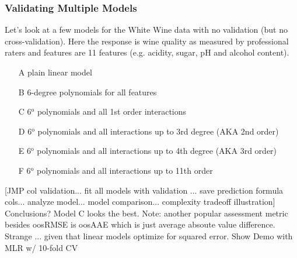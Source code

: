 \documentclass[handout]{beamer}
\begin{document}
\begin{frame}\frametitle{Validating Multiple Models}
\footnotesize
Let's look at a few models for the White Wine data with no validation (but no cross-validation). Here the response is wine quality as measured by professional raters and features are 11 features (e.g. acidity, sugar, pH and alcohol content).

\vspace{-0.1cm}
\begin{enumerate}\footnotesize
\item[A] plain linear model \pause
\item[B] 6-degree polynomials for all features \pause
\item[C] 6$^{\text{o}}$ polynomials and all 1st order interactions  \pause
\item[D] 6$^{\text{o}}$ polynomials and all interactions up to 3rd degree (AKA 2nd order) \pause
\item[E] 6$^{\text{o}}$ polynomials and all interactions up to 4th degree (AKA 3rd order) \pause
\item[F] 6$^{\text{o}}$ polynomials and all interactions up to 11th order \pause
\end{enumerate}
\footnotesize
\vspace{-0.1cm}
[JMP col validation... fit all models with validation ... save prediction formula cols... analyze model... model comparison... \pause complexity tradeoff illustration] \pause Conclusions? \pause Model C looks the best. \pause Note: another popular assessment metric besides oosRMSE is oosAAE which is just average absoute value difference. Strange ... given that linear models optimize for squared error. \pause 
Show Demo with MLR w/ 10-fold CV \pause {} 
	
\end{frame}
\end{document}
